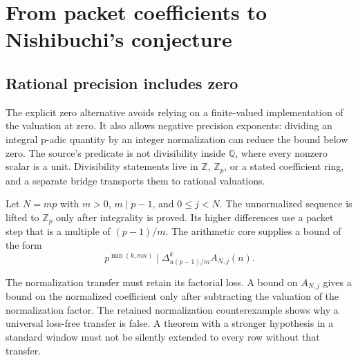 \section{From packet coefficients to Nishibuchi's conjecture}\label{sec:arithmetic}
\subsection{Rational precision includes zero}
The explicit zero alternative avoids relying on a finite-valued implementation of the valuation at zero. It also allows negative precision exponents: dividing an integral p-adic quantity by an integer normalization can reduce the bound below zero. The source's  predicate is not divisibility inside $\mathbb Q$, where every nonzero scalar is a unit. Divisibility statements live in $\mathbb Z$, $\mathbb Z_p$, or a stated coefficient ring, and a separate bridge transports them to rational valuations.

Let $N=mp$ with $m>0$, $m\mid p-1$, and $0\le j<N$. The unnormalized sequence is lifted to $\mathbb Z_p$ only after integrality is proved. Its higher differences use a packet step that is a multiple of $(p-1)/m$. The arithmetic core supplies a bound of the form
\[
 p^{\min(k,mn)}\mid\Delta_{u(p-1)/m}^{k}A_{N,j}(n).
\]

The normalization transfer must retain its factorial loss. A bound on $A_{N,j}$ gives a bound on the normalized coefficient only after subtracting the valuation of the normalization factor. The retained normalization counterexample shows why a universal loss-free transfer is false. A theorem with a stronger hypothesis in a standard window must not be silently extended to every row without that transfer.

